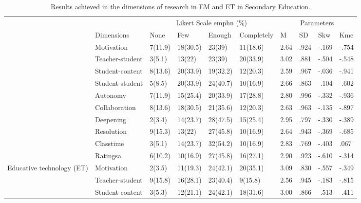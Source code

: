 \documentclass[english]{textolivre}
\begin{document}
\begin{table}[htpb]
\caption{Results achieved in the dimensions of research in EM and ET in Secondary Education.}
\label{tab2}
\centering
\small
\begin{tabular}{p{}p{}p{}p{}p{}p{}p{}p{}p{}p{}}
\toprule 
& & \multicolumn{4}{c}{Likert Scale emph{n (\%)}} & \multicolumn{4}{c}{Parameters}
\\ 
& Dimensions & None & Few & Enough & Completely & M & SD & Skw & Kme
\\
\midrule
\arrayrulecolor[gray]{.7}
\multirow{10}{=}{Emerging methodology (EM)}	& Motivation & 7(11.9) & 18(30.5) & 23(39) & 11(18.6) & 2.64 & .924 & -.169 & -.754
\\
& Teacher-student	& 3(5.1) & 13(22) & 23(39) & 20(33.9) & 3.02 & .881 & -.504 & -.548
\\ 
& Student-content & 8(13.6) & 20(33.9) & 19(32.2) & 12(20.3) & 2.59 & .967 & -.036 & -.941
\\
& Student-student & 5(8.5) & 20(33.9) & 24(40.7) & 10(16.9) & 2.66 & .863 & -.104 & -.602
\\
& Autonomy & 7(11.9) & 15(25.4) & 20(33.9) & 17(28.8) &	2.80 & .996 & -.332 & -.936
\\
& Collaboration	& 8(13.6) & 18(30.5) & 21(35.6) & 12(20.3) & 2.63 & .963 & -.135 & -.897
\\
& Deepening	& 2(3.4) & 14(23.7) & 28(47.5) & 15(25.4) & 2.95 & .797 & -.330 & -.389
\\
& Resolution & 9(15.3) & 13(22) & 27(45.8) & 10(16.9) & 2.64 & .943 & -.369 & -.685
\\
& Classtime	& 3(5.1) & 14(23.7) & 32(54.2) & 10(16.9) &	2.83 & .769 & -.403 & .067
\\
& Ratingsa & 6(10.2) & 10(16.9) & 27(45.8) & 16(27.1) & 2.90 & .923 & -.610 & -.314
\\ 
\midrule
\multirow{10}{=}{Educative technology (ET)} & Motivation & 2(3.5) & 11(19.3) & 24(42.1) & 20(35.1) & 3.09 & .830 & -.557 & -.349
\\
& Teacher-student & 9(15.8) & 16(28.1) & 23(40.4) & 9(15.8) & 2.56 & .945 & -.183 & -.815
\\
& Student-content & 3(5.3) & 12(21.1) & 24(42.1) & 18(31.6) & 3.00 & .866 & -.513 & -.411

\end{tabular}
\end{table}
\end{document}
